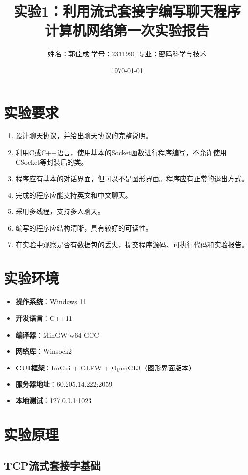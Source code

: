 \documentclass[12pt, a4paper]{article}
\title{\textbf{\LARGE 实验1：利用流式套接字编写聊天程序\\计算机网络第一次实验报告}}
\author{姓名：郭佳成 \quad 学号：2311990 \quad 专业：密码科学与技术}
\date{\today}
\begin{document}
\maketitle

\section{实验要求}

\begin{enumerate}[itemsep=5pt]
  \item 设计聊天协议，并给出聊天协议的完整说明。
  \item 利用C或C++语言，使用基本的Socket函数进行程序编写，不允许使用CSocket等封装后的类。
  \item 程序应有基本的对话界面，但可以不是图形界面。程序应有正常的退出方式。
  \item 完成的程序应能支持英文和中文聊天。
  \item 采用多线程，支持多人聊天。
  \item 编写的程序应结构清晰，具有较好的可读性。
  \item 在实验中观察是否有数据包的丢失，提交程序源码、可执行代码和实验报告。
\end{enumerate}

\section{实验环境}

\begin{itemize}[itemsep=3pt]
  \item \textbf{操作系统}：Windows 11
  \item \textbf{开发语言}：C++11
  \item \textbf{编译器}：MinGW-w64 GCC
  \item \textbf{网络库}：Winsock2
  \item \textbf{GUI框架}：ImGui + GLFW + OpenGL3（图形界面版本）
  \item \textbf{服务器地址}：60.205.14.222:2059
  \item \textbf{本地测试}：127.0.0.1:1023
\end{itemize}

\section{实验原理}

\subsection{TCP流式套接字基础}
\end{document}
